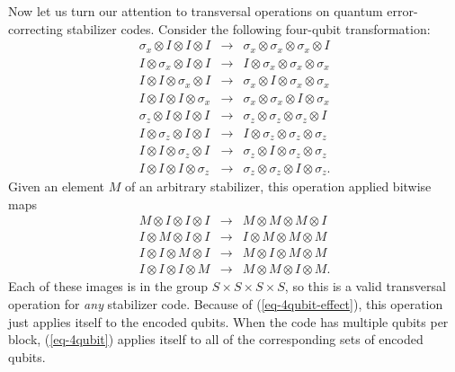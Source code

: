 \documentclass{report}
\newcommand{\X}{\sigma_x}
\newcommand{\Z}{\sigma_z}
\begin{document}
Now let us turn our attention to transversal operations on quantum
error-correcting stabilizer codes.  Consider the following four-qubit 
transformation:
\begin{eqnarray}
\X \otimes I \otimes I \otimes I & \rightarrow & \X \otimes \X \otimes \X 
\otimes I \nonumber \\
I \otimes \X \otimes I \otimes I & \rightarrow & I \otimes \X \otimes \X 
\otimes \X \nonumber \\
I \otimes I \otimes \X \otimes I & \rightarrow & \X \otimes I \otimes \X 
\otimes \X \nonumber \\
I \otimes I \otimes I \otimes \X & \rightarrow & \X \otimes \X \otimes I 
\otimes \X \label{eq-4qubit} \\
\Z \otimes I \otimes I \otimes I & \rightarrow & \Z \otimes \Z \otimes \Z 
\otimes I \nonumber \\
I \otimes \Z \otimes I \otimes I & \rightarrow & I \otimes \Z \otimes \Z 
\otimes \Z \nonumber \\
I \otimes I \otimes \Z \otimes I & \rightarrow & \Z \otimes I \otimes \Z 
\otimes \Z \nonumber \\
I \otimes I \otimes I \otimes \Z & \rightarrow & \Z \otimes \Z \otimes I 
\otimes \Z. \nonumber
\end{eqnarray}
Given an element $M$ of an arbitrary stabilizer, this operation applied
bitwise maps
\begin{eqnarray}
M \otimes I \otimes I \otimes I & \rightarrow & M \otimes M \otimes M 
\otimes I \nonumber \\
I \otimes M \otimes I \otimes I & \rightarrow & I \otimes M \otimes M 
\otimes M \label{eq-4qubit-effect} \\
I \otimes I \otimes M \otimes I & \rightarrow & M \otimes I \otimes M 
\otimes M \nonumber \\
I \otimes I \otimes I \otimes M & \rightarrow & M \otimes M \otimes I 
\otimes M. \nonumber
\end{eqnarray}
Each of these images is in the group $S \times S \times S \times S$, so this 
is a valid transversal operation for {\em any} stabilizer code.  Because of 
(\ref{eq-4qubit-effect}), this operation just applies itself to the encoded 
qubits.  When the code has multiple qubits per block, (\ref{eq-4qubit}) 
applies itself to all of the corresponding sets of encoded qubits.
\end{document}

